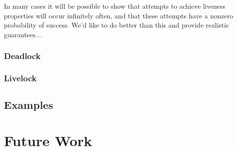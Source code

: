 \documentclass{acm_proc_article-sp-sigmod09}
\begin{document}
In many cases it will be possible to show that attempts to achieve liveness properties will occur infinitely often, and that
these attempts have a nonzero probability of success.  We'd like to do better than this and provide realistic guarantees...

\subsubsection{Deadlock}



\subsubsection{Livelock}

\subsection{Examples}

\section{Future Work}


\end{document}
